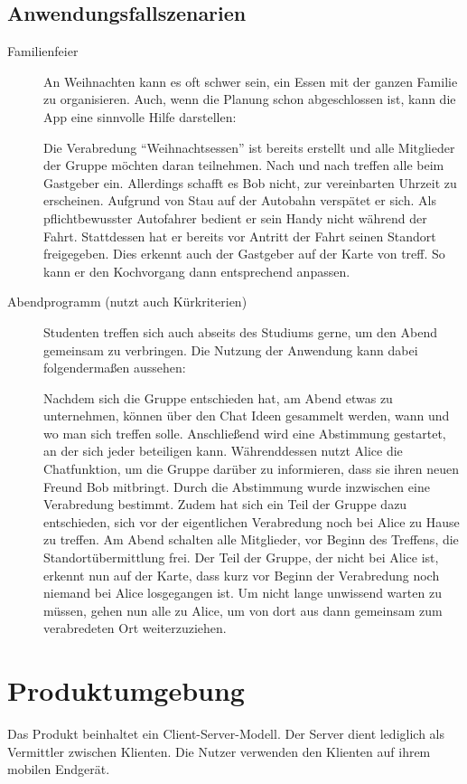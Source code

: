 \documentclass[parskip=full,11pt]{scrartcl}
\begin{document}
\subsection{Anwendungsfallszenarien}
\begin{description}
\item[Familienfeier]
An Weihnachten kann es oft schwer sein, ein Essen mit der ganzen Familie zu organisieren.
Auch, wenn die Planung schon abgeschlossen ist, kann die App eine sinnvolle Hilfe darstellen:

Die Verabredung \enquote{Weihnachtsessen} ist bereits erstellt und alle Mitglieder der Gruppe möchten daran teilnehmen.
Nach und nach treffen alle beim Gastgeber ein. Allerdings schafft es Bob nicht, zur vereinbarten Uhrzeit zu erscheinen.
Aufgrund von Stau auf der Autobahn verspätet er sich.
Als pflichtbewusster Autofahrer bedient er sein Handy nicht während der Fahrt.
Stattdessen hat er bereits vor Antritt der Fahrt seinen Standort freigegeben.
Dies erkennt auch der Gastgeber auf der Karte von treff. So kann er den Kochvorgang dann entsprechend anpassen.
\\
\item[Abendprogramm (nutzt auch Kürkriterien)]
Studenten treffen sich auch abseits des Studiums gerne, um den Abend gemeinsam zu verbringen.
Die Nutzung der Anwendung kann dabei folgendermaßen aussehen:

Nachdem sich die Gruppe entschieden hat, am Abend etwas zu unternehmen,
können über den Chat Ideen gesammelt werden, wann und wo man sich treffen solle.
Anschließend wird eine Abstimmung gestartet, an der sich jeder beteiligen kann.
Währenddessen nutzt Alice die Chatfunktion, um die Gruppe darüber zu informieren, dass sie ihren neuen Freund Bob mitbringt.
Durch die Abstimmung wurde inzwischen eine Verabredung bestimmt.
Zudem hat sich ein Teil der Gruppe dazu entschieden, sich vor der eigentlichen Verabredung noch bei Alice zu Hause zu treffen.
Am Abend schalten alle Mitglieder, vor Beginn des Treffens, die Standortübermittlung frei.
Der Teil der Gruppe, der nicht bei Alice ist, erkennt nun auf der Karte,
dass kurz vor Beginn der Verabredung noch niemand bei Alice losgegangen ist.
Um nicht lange unwissend warten zu müssen,
gehen nun alle zu Alice, um von dort aus dann gemeinsam zum verabredeten Ort weiterzuziehen.
\end{description}

\pagebreak
\section{Produktumgebung}
Das Produkt beinhaltet ein Client-Server-Modell.
Der Server dient lediglich als Vermittler zwischen Klienten.
Die Nutzer verwenden den Klienten auf ihrem mobilen Endgerät.
\end{document}
